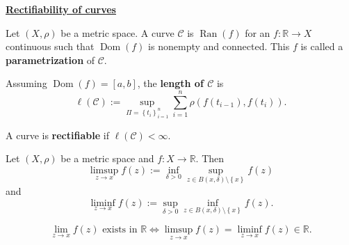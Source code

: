 \documentclass{notes}
\begin{document}
  \strut
  
  \underline{{\boldmath \bfseries Rectifiability of curves}}
  
  \begin{defn}
    Let $(X, \rho)$ be a metric space.
    A curve $\mathcal C$ is $\operatorname{Ran}(f)$ for an $f \colon \mathbb R \to X$ continuous such that $\operatorname{Dom}(f)$ is nonempty and connected.
    This $f$ is called a {\boldmath \bfseries parametrization} of $\mathcal C$.
  \end{defn}
  
  \begin{defn}
    Assuming $\operatorname{Dom}(f) = [a, b]$, the {\boldmath \bfseries length of $\mathcal C$} is 
    \[
      \ell(\mathcal C) := \sup_{\Pi = \left \{ t_i \right \}_{i = 1}^n} \sum_{i = 1}^n \rho(f(t_{i - 1}), f(t_i)).
    \]
  \end{defn}
  
  \begin{defn}
    A curve is {\boldmath \bfseries rectifiable} if $\ell(\mathcal C) < \infty$.
  \end{defn}
  
  \newpage
  
  \begin{defn}
    Let $(X, \rho)$ be a metric space and $f \colon X \to \mathbb R$.
    Then 
    \[
      \limsup_{z \to x} f(z) := \inf_{\delta > 0} \sup_{z \in B(x, \delta) \setminus \left \{ x \right \}} f(z)
    \]
    and 
    \[
      \liminf_{z \to x} f(z) := \sup_{\delta > 0} \inf_{z \in B(x, \delta) \setminus \left \{ x \right \}} f(z).
    \]
  \end{defn}
  
  \begin{lem}
    \[
      \lim_{z \to x} f(z) \text{ exists in $\mathbb R$} \Leftrightarrow \limsup_{z \to x} f(z) = \liminf_{z \to x} f(z) \in \mathbb R.
    \]
  \end{lem}
\end{document}
